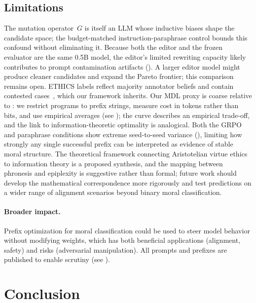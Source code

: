 \documentclass[preprint]{article}
\begin{document}
\subsection{Limitations}

The mutation operator~$G$ is itself an LLM whose inductive biases shape the candidate space; the budget-matched instruction-paraphrase control bounds this confound without eliminating it.
Because both the editor and the frozen evaluator are the same 0.5B model, the editor's limited rewriting capacity likely contributes to prompt contamination artifacts ().
A larger editor model might produce cleaner candidates and expand the Pareto frontier; this comparison remains open.
ETHICS labels reflect majority annotator beliefs and contain contested cases~\citep{hendrycks2021ethics}, which our framework inherits.
Our MDL proxy is coarse relative to \citet{finzi2026epiplexity}: we restrict programs to prefix strings, measure cost in tokens rather than bits, and use empirical averages (see ); the curve describes an empirical trade-off, and the link to information-theoretic optimality is analogical.
Both the GRPO and paraphrase conditions show extreme seed-to-seed variance (), limiting how strongly any single successful prefix can be interpreted as evidence of stable moral structure.
The theoretical framework connecting Aristotelian virtue ethics to information theory is a proposed synthesis, and the mapping between phronesis and epiplexity is suggestive rather than formal; future work should develop the mathematical correspondence more rigorously and test predictions on a wider range of alignment scenarios beyond binary moral classification.

\paragraph{Broader impact.}
Prefix optimization for moral classification could be used to steer model behavior without modifying weights, which has both beneficial applications (alignment, safety) and risks (adversarial manipulation).
All prompts and prefixes are published to enable scrutiny (see ).

\section{Conclusion}
\label{sec:conclusion}
\end{document}
